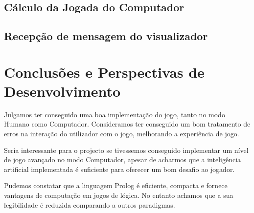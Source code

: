 \documentclass[15pt,a4paper]{article}
\begin{document}
\subsection{Cálculo da Jogada do Computador}




\subsection{Recepção de mensagem do visualizador}



\newpage

\section{Conclusões e Perspectivas de Desenvolvimento}


Julgamos ter conseguido uma boa implementação do jogo, tanto no modo Humano como Computador.
Consideramos ter conseguido um bom tratamento de erros na interação do utilizador com o jogo, melhorando a experiência de jogo.

Seria interessante para o projecto se tivessemos conseguido implementar um nível de jogo avançado no modo Computador, apesar de acharmos que a inteligência artificial implementada é suficiente para oferecer um bom desafio ao jogador.

Pudemos constatar que a linguagem Prolog é eficiente, compacta e fornece vantagens de computação em jogos de lógica. No entanto achamos que a sua legibilidade é reduzida comparando a outros paradigmas.




\clearpage

\renewcommand\refname{Bibliografia}


\end{document}
